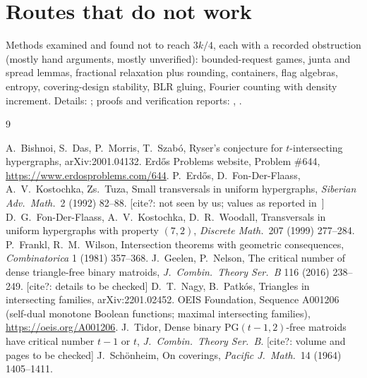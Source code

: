 \documentclass[11pt]{article}
\theoremstyle{definition}
\begin{document}
\section{Routes that do not work}\label{sec:dead}

Methods examined and found not to reach $3k/4$, each with a recorded obstruction (mostly hand arguments, mostly
unverified): bounded-request games, junta and spread lemmas, fractional relaxation plus rounding, containers, flag
algebras, entropy, covering-design stability, BLR gluing, Fourier counting with density increment. Details:
; proofs and verification reports: , .

\begin{thebibliography}{9}\footnotesize\raggedright\setlength{\itemsep}{0pt}\setlength{\parskip}{0pt}
 A.~Bishnoi, S.~Das, P.~Morris, T.~Szab\'o, Ryser's conjecture for $t$-intersecting hypergraphs,
arXiv:2001.04132.
 Erd\H{o}s Problems website, Problem \#644, \url{https://www.erdosproblems.com/644}.
 P.~Erd\H{o}s, D.~Fon-Der-Flaass, A.~V.~Kostochka, Zs.~Tuza, Small transversals in uniform
hypergraphs, \emph{Siberian Adv.\ Math.}\ 2 (1992) 82--88. [cite?: not seen by us; values as reported in~\cite{EP}]
 D.~G.~Fon-Der-Flaass, A.~V.~Kostochka, D.~R.~Woodall, Transversals in uniform hypergraphs with property
$(7,2)$, \emph{Discrete Math.}\ 207 (1999) 277--284.
 P.~Frankl, R.~M.~Wilson, Intersection theorems with geometric consequences, \emph{Combinatorica} 1
(1981) 357--368.
 J.~Geelen, P.~Nelson, The critical number of dense triangle-free binary matroids, \emph{J.\ Combin.\
Theory Ser.~B} 116 (2016) 238--249. [cite?: details to be checked]
\bibitem{NP} D.~T.~Nagy, B.~Patk\'os, Triangles in intersecting families, arXiv:2201.02452.
\bibitem{OEIS} OEIS Foundation, Sequence A001206 (self-dual monotone Boolean functions; maximal intersecting
families), \url{https://oeis.org/A001206}.
 J.~Tidor, Dense binary $\mathrm{PG}(t-1,2)$-free matroids have critical number $t-1$ or $t$,
\emph{J.\ Combin.\ Theory Ser.~B}. [cite?: volume and pages to be checked]
\bibitem{Sch} J.~Sch\"onheim, On coverings, \emph{Pacific J.\ Math.}\ 14 (1964) 1405--1411.
\end{thebibliography}
\end{document}
